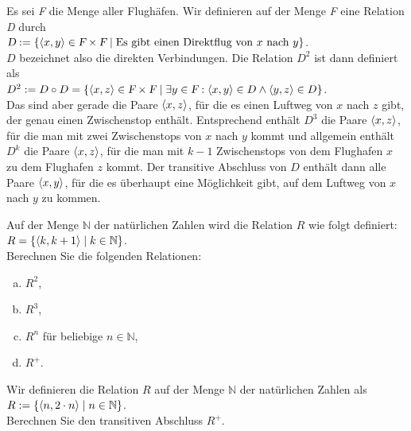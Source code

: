\example
Es sei \textsl{F} die Menge aller Flugh\"{a}fen.  Wir definieren auf der Menge \textsl{F} eine
Relation \textsl{D} durch
\\[0.2cm]
\hspace*{1.3cm}
$\textsl{D} := \{ \pair(x,y) \in \textsl{F} \times \textsl{F} \mid
                  \mbox{Es gibt einen Direktflug von $x$ nach $y$} \}$.
\\[0.2cm]
$D$ bezeichnet also die direkten Verbindungen.  Die Relation $D^2$ ist dann definiert als
\\[0.2cm]
\hspace*{1.3cm}
$D^2 := D \circ D = \{ \pair(x,z) \in \textsl{F} \times \textsl{F} \mid 
          \exists y \in \textsl{F}: \pair(x,y) \in D \wedge \pair(y,z) \in D \}$.
\\[0.2cm]
Das sind aber gerade die Paare $\pair(x,z)$, f\"{u}r die es einen Luftweg von $x$ nach $z$
gibt, der genau einen Zwischenstop enth\"{a}lt.  Entsprechend enth\"{a}lt $D^3$ die Paare
$\pair(x,z)$, f\"{u}r die man mit zwei Zwischenstops von $x$ nach $y$ kommt und allgemein
enth\"{a}lt $D^k$ die Paare $\pair(x,z)$, f\"{u}r die man mit $k-1$ Zwischenstops von dem
Flughafen $x$ zu dem Flughafen $z$ kommt.
Der transitive Abschluss von $D$ enth\"{a}lt
dann alle Paare $\pair(x,y)$, f\"{u}r die es \"{u}berhaupt eine M\"{o}glichkeit gibt, auf dem Luftweg
von $x$ nach $y$ zu kommen. \eox

\exercise
Auf der Menge $\mathbb{N}$ der nat\"{u}rlichen Zahlen wird die Relation $R$ wie folgt definiert:
\\[0.2cm]
\hspace*{1.3cm}
$R = \{ \pair(k, k + 1) \mid k \in \mathbb{N} \}$.
\\[0.2cm]
Berechnen Sie die folgenden Relationen:
\begin{enumerate}[(a)]
\item $R^2$,
\item $R^3$,
\item $R^n$ f\"{u}r beliebige $n \in \mathbb{N}$,
\item $R^+$. \exend
\end{enumerate}

\exercise
Wir definieren die Relation $R$ auf der Menge $\mathbb{N}$ der nat\"{u}rlichen Zahlen als
\\[0.2cm]
\hspace*{1.3cm}
$R := \{ \pair(n, 2 \cdot n) \mid n \in \mathbb{N} \}$.
\\[0.2cm]
Berechnen Sie den transitiven Abschluss $R^+$.
\exend


